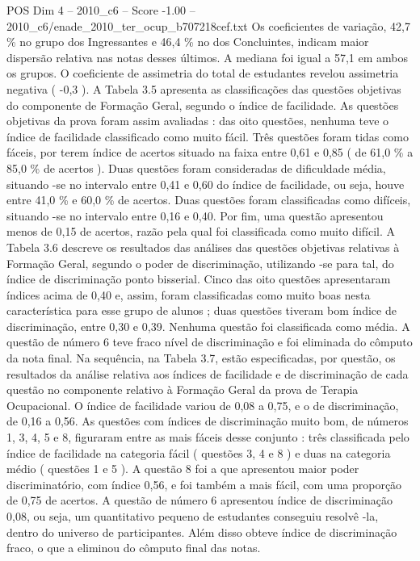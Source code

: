 \begin{textsample}{POS Dim 4 – 2010\_c6 – Score -1.00 – 2010\_c6/enade\_2010\_ter\_ocup\_b707218cef.txt}
Os coeficientes de variação, 42,7 \% no grupo dos Ingressantes e 46,4 \% no dos Concluintes, indicam maior dispersão relativa nas notas desses últimos.
A mediana foi igual a 57,1 em ambos os grupos.
O coeficiente de assimetria do total de estudantes revelou assimetria negativa ( -0,3 ).
A Tabela 3.5 apresenta as classificações das questões objetivas do componente de Formação Geral, segundo o índice de facilidade.
As questões objetivas da prova foram assim avaliadas : das oito questões, nenhuma teve o índice de facilidade classificado como muito fácil.
Três questões foram tidas como fáceis, por terem índice de acertos situado na faixa entre 0,61 e 0,85 ( de 61,0 \% a 85,0 \% de acertos ).
Duas questões foram consideradas de dificuldade média, situando -se no intervalo entre 0,41 e 0,60 do índice de facilidade, ou seja, houve entre 41,0 \% e 60,0 \% de acertos.
Duas questões foram classificadas como difíceis, situando -se no intervalo entre 0,16 e 0,40.
Por fim, uma questão apresentou menos de 0,15 de acertos, razão pela qual foi classificada como muito difícil.
A Tabela 3.6 descreve os resultados das análises das questões objetivas relativas à Formação Geral, segundo o poder de discriminação, utilizando -se para tal, do índice de discriminação ponto bisserial.
Cinco das oito questões apresentaram índices acima de 0,40 e, assim, foram classificadas como muito boas nesta característica para esse grupo de alunos ; duas questões tiveram bom índice de discriminação, entre 0,30 e 0,39.
Nenhuma questão foi classificada como média.
A questão de número 6 teve fraco nível de discriminação e foi eliminada do cômputo da nota final.
Na sequência, na Tabela 3.7, estão especificadas, por questão, os resultados da análise relativa aos índices de facilidade e de discriminação de cada questão no componente relativo à Formação Geral da prova de Terapia Ocupacional.
O índice de facilidade variou de 0,08 a 0,75, e o de discriminação, de 0,16 a 0,56.
As questões com índices de discriminação muito bom, de números 1, 3, 4, 5 e 8, figuraram entre as mais fáceis desse conjunto : três classificada pelo índice de facilidade na categoria fácil ( questões 3, 4 e 8 ) e duas na categoria médio ( questões 1 e 5 ).
A questão 8 foi a que apresentou maior poder discriminatório, com índice 0,56, e foi também a mais fácil, com uma proporção de 0,75 de acertos.
A questão de número 6 apresentou índice de discriminação 0,08, ou seja, um quantitativo pequeno de estudantes conseguiu resolvê -la, dentro do universo de participantes.
Além disso obteve índice de discriminação fraco, o que a eliminou do cômputo final das notas.

\end{textsample}
